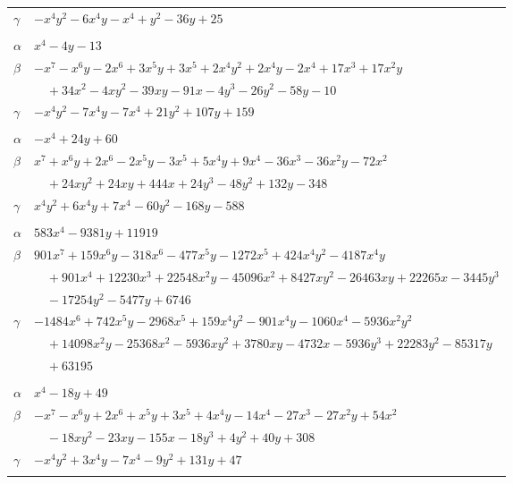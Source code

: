 \documentclass[11pt]{article}
\begin{document}
\begin{longtable}{@{}ll@{}}
$\gamma$ & $-x^{4}y^{2}-6x^{4}y-x^{4}+y^{2}-36y+25$\\
\addlinespace[3pt]
\multicolumn{2}{@{}l}{$\{i,j\}=\{14,32\}$, $k_{ij}=2^{6}\cdot 3$}\\
$\alpha$ & $x^{4}-4y-13$\\
$\beta$ & $-x^{7}-x^{6}y-2x^{6}+3x^{5}y+3x^{5}+2x^{4}y^{2}+2x^{4}y-2x^{4}+17x^{3}+17x^{2}y$\\
 & $\quad +34x^{2}-4xy^{2}-39xy-91x-4y^{3}-26y^{2}-58y-10$\\
$\gamma$ & $-x^{4}y^{2}-7x^{4}y-7x^{4}+21y^{2}+107y+159$\\
\addlinespace[3pt]
\multicolumn{2}{@{}l}{$\{i,j\}=\{14,35\}$, $k_{ij}=2^{3}\cdot 3^{2}\cdot 17$}\\
$\alpha$ & $-x^{4}+24y+60$\\
$\beta$ & $x^{7}+x^{6}y+2x^{6}-2x^{5}y-3x^{5}+5x^{4}y+9x^{4}-36x^{3}-36x^{2}y-72x^{2}$\\
 & $\quad +24xy^{2}+24xy+444x+24y^{3}-48y^{2}+132y-348$\\
$\gamma$ & $x^{4}y^{2}+6x^{4}y+7x^{4}-60y^{2}-168y-588$\\
\addlinespace[3pt]
\multicolumn{2}{@{}l}{$\{i,j\}=\{15,22\}$, $k_{ij}=11^{2}\cdot 13$}\\
$\alpha$ & $583x^{4}-9381y+11919$\\
$\beta$ & $901x^{7}+159x^{6}y-318x^{6}-477x^{5}y-1272x^{5}+424x^{4}y^{2}-4187x^{4}y$\\
 & $\quad +901x^{4}+12230x^{3}+22548x^{2}y-45096x^{2}+8427xy^{2}-26463xy+22265x-3445y^{3}$\\
 & $\quad -17254y^{2}-5477y+6746$\\
$\gamma$ & $-1484x^{6}+742x^{5}y-2968x^{5}+159x^{4}y^{2}-901x^{4}y-1060x^{4}-5936x^{2}y^{2}$\\
 & $\quad +14098x^{2}y-25368x^{2}-5936xy^{2}+3780xy-4732x-5936y^{3}+22283y^{2}-85317y$\\
 & $\quad +63195$\\
\addlinespace[3pt]
\multicolumn{2}{@{}l}{$\{i,j\}=\{15,26\}$, $k_{ij}=2^{3}\cdot 5\cdot 13$}\\
$\alpha$ & $x^{4}-18y+49$\\
$\beta$ & $-x^{7}-x^{6}y+2x^{6}+x^{5}y+3x^{5}+4x^{4}y-14x^{4}-27x^{3}-27x^{2}y+54x^{2}$\\
 & $\quad -18xy^{2}-23xy-155x-18y^{3}+4y^{2}+40y+308$\\
$\gamma$ & $-x^{4}y^{2}+3x^{4}y-7x^{4}-9y^{2}+131y+47$\\
\addlinespace[3pt]
\multicolumn{2}{@{}l}{$\{i,j\}=\{15,32\}$, $k_{ij}=2^{6}\cdot 3\cdot 7$}\\

\end{longtable}
\end{document}
